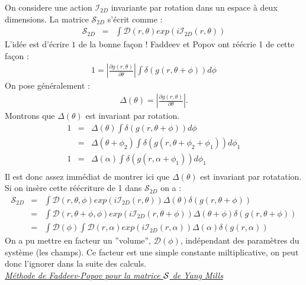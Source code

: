 \documentclass[a4paper,11pt]{article} %
\theoremstyle{plain}
\theoremstyle{definition}
\theoremstyle{remark}
\numberwithin{equation}{section}
\numberwithin{equation}{subsection}
\numberwithin{figure}{section}
\begin{document}
\noindent
On considere une action $\mathcal{I}_{2D}$ invariante par rotation dans un espace à deux dimensions. La matrice $\mathcal{S}_{2D}$ s'écrit comme :
\begin{eqnarray*}
 \mathcal{S}_{2D} &=& \int \mathcal{D}(r,\theta) exp\left(i\mathcal{I}_{2D}(r,\theta)\right) 
\end{eqnarray*}
L'idée est d'écrire $1$ de la bonne façon ! Faddeev et Popov ont réécrie 1 de cette façon :
\begin{eqnarray*}
 1 = \left| \frac{\partial g(r,\theta)}{\partial \theta} \right| \int \delta \left(g(r,\theta + \phi)\right)d\phi
\end{eqnarray*}
On pose généralement :
\begin{eqnarray*}
 \Delta(\theta) = \left| \frac{\partial g(r,\theta)}{\partial \theta} \right| .
\end{eqnarray*}
Montrons que $\Delta(\theta)$ est invariant par rotation.
\begin{eqnarray*}
 1 &=& \Delta(\theta) \int \delta \left(g(r,\theta + \phi)\right)d\phi \\
     &=& \Delta(\theta + \phi_{2}) \int \delta \left(g(r,\theta + \phi_{2} + \phi_{1} )\right)d\phi_{1} \\
 1&=& \Delta(\alpha) \int \delta \left(g(r,\alpha + \phi_{1} )\right)d\phi_{1} \\
\end{eqnarray*}
Il est donc assez immédiat de montrer ici que $\Delta ( \theta) $ est invariant par rotatation.
Si on insère cette réécriture de 1  dans $\mathcal{S}_{2D}$ on a :
\begin{eqnarray*}
 \mathcal{S}_{2D} &=& \int \mathcal{D}(r,\theta,\phi)
exp\left(i\mathcal{I}_{2D}(r,\theta)\right) 
\Delta(\theta) \delta \left(g(r,\theta + \phi)\right)\\
                 &=& \int \mathcal{D}(r,\theta + \phi, \phi)
exp\left(i\mathcal{I}_{2D}(r,\theta + \phi)\right) 
\Delta(\theta+\phi) \delta \left(g(r,\theta + \phi)\right)\\ 
		 &=& \int \mathcal{D}(\phi) \int \mathcal{D}(r,\alpha)
exp\left(i\mathcal{I}_{2D}(r,\alpha)\right) 
\Delta(\alpha) \delta \left(g(r,\alpha)\right)
\end{eqnarray*}
On a pu mettre en facteur un ''volume'', $\mathcal{D}(\phi)$, indépendant des paramètres du système (les champs). Ce facteur est une simple 
constante miltiplicative, on peut donc l'ignorer dans la suite des calculs.\\

\noindent
\textit{\underline{Méthode de Faddeev-Popov pour la matrice $\cal{S}$ de Yang Mills}}\\
\end{document}
